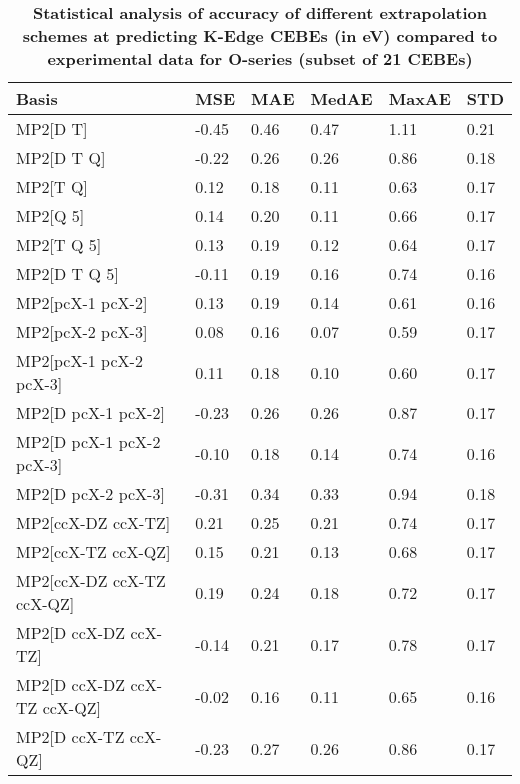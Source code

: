 \begin{table}
  \caption{\textbf{Statistical analysis of accuracy of different extrapolation schemes at predicting K-Edge CEBEs (in eV) compared to experimental data for O-series (subset of 21 CEBEs)}}
  \begin{tabular}{l l l l l l }
    \toprule
    \textbf{Basis} & \textbf{MSE} & \textbf{MAE} & \textbf{MedAE} & \textbf{MaxAE} & \textbf{STD} \\ 
    \midrule
    MP2[D T] & -0.45 & 0.46 & 0.47 & 1.11 & 0.21 \\ 
    MP2[D T Q] & -0.22 & 0.26 & 0.26 & 0.86 & 0.18 \\ 
    MP2[T Q] & 0.12 & 0.18 & 0.11 & 0.63 & 0.17 \\ 
    MP2[Q 5] & 0.14 & 0.20 & 0.11 & 0.66 & 0.17 \\ 
    MP2[T Q 5] & 0.13 & 0.19 & 0.12 & 0.64 & 0.17 \\ 
    MP2[D T Q 5] & -0.11 & 0.19 & 0.16 & 0.74 & 0.16 \\ 
    MP2[pcX-1 pcX-2] & 0.13 & 0.19 & 0.14 & 0.61 & 0.16 \\ 
    MP2[pcX-2 pcX-3] & 0.08 & 0.16 & 0.07 & 0.59 & 0.17 \\ 
    MP2[pcX-1 pcX-2 pcX-3] & 0.11 & 0.18 & 0.10 & 0.60 & 0.17 \\ 
    MP2[D pcX-1 pcX-2] & -0.23 & 0.26 & 0.26 & 0.87 & 0.17 \\ 
    MP2[D pcX-1 pcX-2 pcX-3] & -0.10 & 0.18 & 0.14 & 0.74 & 0.16 \\ 
    MP2[D pcX-2 pcX-3] & -0.31 & 0.34 & 0.33 & 0.94 & 0.18 \\ 
    MP2[ccX-DZ ccX-TZ] & 0.21 & 0.25 & 0.21 & 0.74 & 0.17 \\ 
    MP2[ccX-TZ ccX-QZ] & 0.15 & 0.21 & 0.13 & 0.68 & 0.17 \\ 
    MP2[ccX-DZ ccX-TZ ccX-QZ] & 0.19 & 0.24 & 0.18 & 0.72 & 0.17 \\ 
    MP2[D ccX-DZ ccX-TZ] & -0.14 & 0.21 & 0.17 & 0.78 & 0.17 \\ 
    MP2[D ccX-DZ ccX-TZ ccX-QZ] & -0.02 & 0.16 & 0.11 & 0.65 & 0.16 \\ 
    MP2[D ccX-TZ ccX-QZ] & -0.23 & 0.27 & 0.26 & 0.86 & 0.17 \\ 
    \bottomrule
  \end{tabular}
\end{table}
